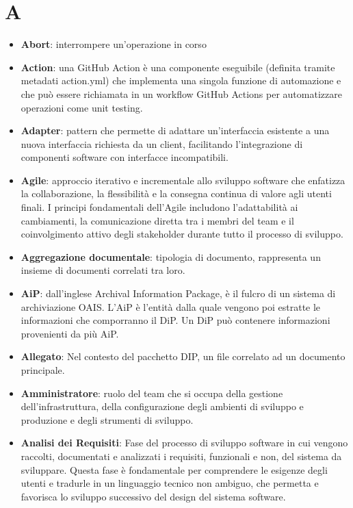 \documentclass[a4paper,12pt]{article}
\begin{document}
\tableofcontents

\newpage

\section{A}
\begin{itemize}
    \item \textbf{Abort}: interrompere un'operazione in corso
    \item \textbf{Action}: una GitHub Action è una componente eseguibile (definita tramite metadati action.yml) che implementa una singola funzione di automazione e che può essere richiamata in un workflow GitHub Actions per automatizzare operazioni come unit testing.
    \item \textbf{Adapter}: pattern che permette di adattare un'interfaccia esistente a una nuova interfaccia richiesta da un client, facilitando l'integrazione di componenti software con interfacce incompatibili.
    \item \textbf{Agile}: approccio iterativo e incrementale allo sviluppo software che enfatizza la collaborazione, la flessibilità e la consegna continua di valore agli utenti finali. I principi fondamentali dell'Agile includono l'adattabilità ai cambiamenti, la comunicazione diretta tra i membri del team e il coinvolgimento attivo degli stakeholder durante tutto il processo di sviluppo.
    \item \textbf{Aggregazione documentale}: tipologia di documento, rappresenta un insieme di documenti correlati tra loro.
    \item \textbf{AiP}: dall'inglese Archival Information Package, è il fulcro di un sistema di archiviazione OAIS. L'AiP è l'entità dalla quale vengono poi estratte le informazioni che comporranno il DiP. Un DiP può contenere informazioni provenienti da più AiP. 
    \item \textbf{Allegato}: Nel contesto del pacchetto DIP, un file correlato ad un documento principale.
    \item \textbf{Amministratore}: ruolo del team che si occupa della gestione dell'infrastruttura, della configurazione degli ambienti di sviluppo e produzione e degli strumenti di sviluppo.
    \item \textbf{Analisi dei Requisiti}: Fase del processo di sviluppo software in cui vengono raccolti, documentati e analizzati i requisiti, funzionali e non, del sistema da sviluppare. Questa fase è fondamentale per comprendere le esigenze degli utenti e tradurle in un linguaggio tecnico non ambiguo, che permetta e favorisca lo sviluppo successivo del design del sistema software.

\end{itemize}
\end{document}

